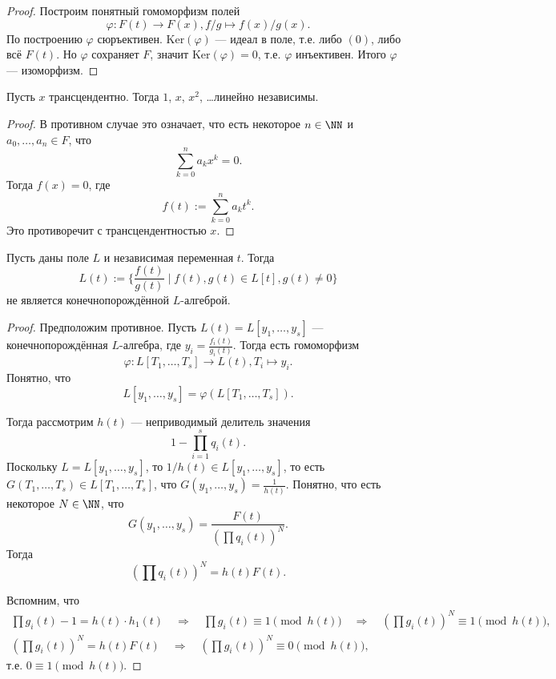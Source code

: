 \documentclass[12pt,a4paper]{article}
\newcommand{\Ker}{\mathrm{Ker}}
\begin{document}
    \begin{proof}
        Построим понятный гомоморфизм полей
        \[\varphi: F(t) \to F(x), f/g \mapsto f(x)/g(x).\]
        По построению $\varphi$ сюръективен. $\Ker(\varphi)$ --- идеал в поле, т.е. либо $(0)$, либо всё $F(t)$. Но $\varphi$ сохраняет $F$, значит $\Ker(\varphi) = 0$, т.е. $\varphi$ инъективен. Итого $\varphi$ --- изоморфизм.
    \end{proof}

    \begin{lemma}
        Пусть $x$ трансцендентно. Тогда $1$, $x$, $x^2$, \dots линейно независимы.
    \end{lemma}

    \begin{proof}
        В противном случае это означает, что есть некоторое $n \in \NN$ и $a_0, \dots, a_n \in F$, что
        \[\sum_{k=0}^n a_k x^k = 0.\]
        Тогда $f(x) = 0$, где
        \[f(t) := \sum_{k=0}^n a_k t^k.\]
        Это противоречит с трансцендентностью $x$.
    \end{proof}

    \begin{lemma}
        Пусть даны поле $L$ и независимая переменная $t$. Тогда
        \[L(t) := \{\frac{f(t)}{g(t)} \mid f(t), g(t) \in L[t], g(t) \neq 0\}\]
        не является конечнопорождённой $L$-алгеброй.
    \end{lemma}

    \begin{proof}
        Предположим противное. Пусть $L(t) = L[y_1, \dots, y_s]$ --- конечнопорождённая $L$-алгебра, где $y_i = \frac{f_i(t)}{g_i(t)}$. Тогда есть гомоморфизм
        \[\varphi: L[T_1, \dots, T_s] \to L(t), T_i \mapsto y_i.\]
        Понятно, что
        \[L[y_1, \dots, y_s] = \varphi(L[T_1, \dots, T_s]).\]

        Тогда рассмотрим $h(t)$ --- неприводимый делитель значения
        \[1 - \prod_{i=1}^s q_i(t).\]
        Поскольку $L = L[y_1, \dots, y_s]$, то $1/h(t) \in L[y_1, \dots, y_s]$, то есть $G(T_1, \dots, T_s) \in L[T_1, \dots, T_s]$, что $G(y_1, \dots, y_s) = \frac{1}{h(t)}$. Понятно, что есть некоторое $N \in \NN$, что
        \[G(y_1, \dots, y_s) = \frac{F(t)}{(\prod q_i(t))^N}.\]
        Тогда
        \[\left(\prod q_i(t)\right)^N = h(t) F(t).\]

        Вспомним, что
        \begin{gather*}
            \prod g_i(t) - 1 = h(t) \cdot h_1(t) \quad \Longrightarrow \quad \prod g_i(t) \equiv 1 \pmod{h(t)} \quad \Longrightarrow \quad \left(\prod g_i(t)\right)^N \equiv 1 \pmod{h(t)},\\
            \left(\prod g_i(t)\right)^N = h(t) F(t) \quad \Longrightarrow \quad \left(\prod g_i(t)\right)^N \equiv 0 \pmod{h(t)},
        \end{gather*}
        т.е. $0 \equiv 1 \pmod{h(t)}$.
    \end{proof}
\end{document}
